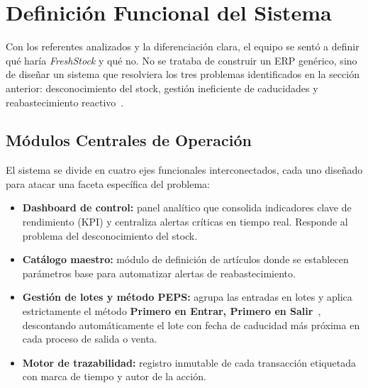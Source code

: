 \documentclass[journal]{IEEEtran}
\newcommand{\app}{\textit{FreshStock}}
\newcommand{\peps}{\textbf{PEPS}}
\begin{document}
	
	
	\section{Definici\'{o}n Funcional del Sistema}
	\label{sec:funcional}
	
	Con los referentes analizados y la diferenciaci\'{o}n clara, el
	equipo se sent\'{o} a definir qu\'{e} har\'{i}a \app{} y qu\'{e}
	no. No se trataba de construir un ERP gen\'{e}rico, sino de
	dise\~{n}ar un sistema que resolviera los tres problemas
	identificados en la secci\'{o}n anterior: desconocimiento del
	stock, gesti\'{o}n ineficiente de caducidades y reabastecimiento
	reactivo~\cite{Silver:2016}.
	
	\subsection{M\'{o}dulos Centrales de Operaci\'{o}n}
	\label{subsec:modulos}
	
	El sistema se divide en cuatro ejes funcionales interconectados,
	cada uno dise\~{n}ado para atacar una faceta espec\'{i}fica del
	problema:
	
	\begin{itemize}[leftmargin=*, label=\textbullet, itemsep=2pt]
		\item \textbf{Dashboard de control:} panel anal\'{i}tico que consolida
		indicadores clave de rendimiento (KPI) y centraliza alertas
		cr\'{i}ticas en tiempo real. Responde al problema del
		desconocimiento del stock.
		
		\item \textbf{Cat\'{a}logo maestro:} m\'{o}dulo de definici\'{o}n de
		art\'{i}culos donde se establecen par\'{a}metros base para
		automatizar alertas de reabastecimiento.
		
		\item \textbf{Gesti\'{o}n de lotes y m\'{e}todo \peps{}:} agrupa las
		entradas en lotes y aplica estrictamente el m\'{e}todo
		\textbf{Primero en Entrar, Primero en
			Salir}~\cite{Silver:2016}, descontando autom\'{a}ticamente
		el lote con fecha de caducidad m\'{a}s pr\'{o}xima en cada
		proceso de salida o venta.
		
		\item \textbf{Motor de trazabilidad:} registro inmutable de cada
		transacci\'{o}n etiquetada con marca de tiempo y autor
		de la acci\'{o}n.
	\end{itemize}
	
\end{document}
